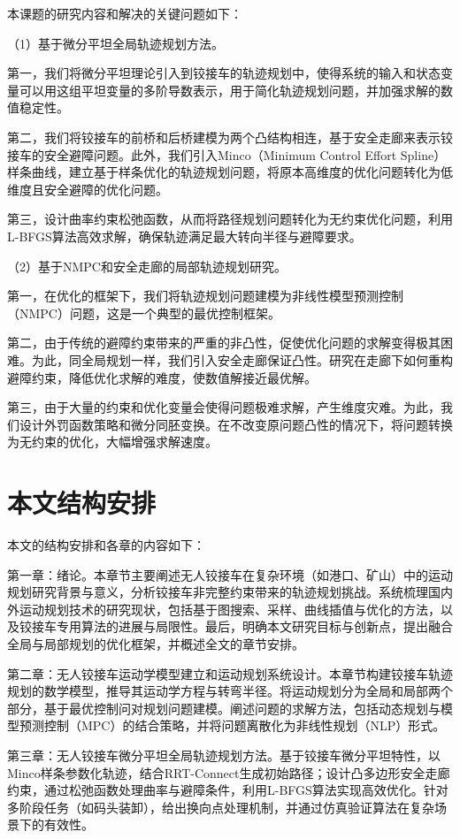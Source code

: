 \documentclass[master,academic]{ysuthesis} %
\begin{document}
	本课题的研究内容和解决的关键问题如下：

	（1）基于微分平坦全局轨迹规划方法。

	第一，我们将微分平坦理论引入到铰接车的轨迹规划中，使得系统的输入和状态变量可以用这组平坦变量的多阶导数表示，用于简化轨迹规划问题，并加强求解的数值稳定性。
	
	第二，我们将铰接车的前桥和后桥建模为两个凸结构相连，基于安全走廊来表示铰接车的安全避障问题。此外，我们引入Minco（Minimum Control Effort Spline）样条曲线，建立基于样条优化的轨迹规划问题，将原本高维度的优化问题转化为低维度且安全避障的优化问题。

	第三，设计曲率约束松弛函数，从而将路径规划问题转化为无约束优化问题，利用L-BFGS算法高效求解，确保轨迹满足最大转向半径与避障要求。

	（2）基于NMPC和安全走廊的局部轨迹规划研究。

	第一，在优化的框架下，我们将轨迹规划问题建模为非线性模型预测控制（NMPC）问题，这是一个典型的最优控制框架。
	
	第二，由于传统的避障约束带来的严重的非凸性，促使优化问题的求解变得极其困难。为此，同全局规划一样，我们引入安全走廊保证凸性。研究在走廊下如何重构避障约束，降低优化求解的难度，使数值解接近最优解。
	
	第三，由于大量的约束和优化变量会使得问题极难求解，产生维度灾难。为此，我们设计外罚函数策略和微分同胚变换。在不改变原问题凸性的情况下，将问题转换为无约束的优化，大幅增强求解速度。

	\section{本文结构安排}
	本文的结构安排和各章的内容如下：

	第一章：绪论。本章节主要阐述无人铰接车在复杂环境（如港口、矿山）中的运动规划研究背景与意义，分析铰接车非完整约束带来的轨迹规划挑战。系统梳理国内外运动规划技术的研究现状，包括基于图搜索、采样、曲线插值与优化的方法，以及铰接车专用算法的进展与局限性。最后，明确本文研究目标与创新点，提出融合全局与局部规划的优化框架，并概述全文的章节安排。

	第二章：无人铰接车运动学模型建立和运动规划系统设计​。本章节构建铰接车轨迹规划的数学模型，推导其运动学方程与转弯半径。将运动规划分为全局和局部两个部分，基于最优控制问对规划问题建模。阐述问题的求解方法，包括动态规划与模型预测控制（MPC）的结合策略，并将问题离散化为非线性规划（NLP）形式。

	第三章：无人铰接车微分平坦全局轨迹规划方法​。基于铰接车微分平坦特性，以Minco样条参数化轨迹，结合RRT-Connect生成初始路径；设计凸多边形安全走廊约束，通过松弛函数处理曲率与避障条件，利用L-BFGS算法实现高效优化。针对多阶段任务（如码头装卸），给出换向点处理机制，并通过仿真验证算法在复杂场景下的有效性。
\end{document}
